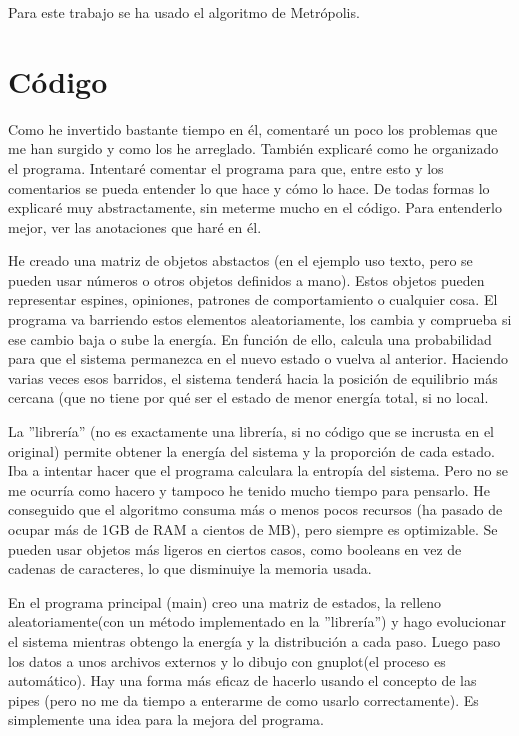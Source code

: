 \documentclass[a4paper,10pt,twocolumn]{article}
\begin{document}
Para este trabajo se ha usado el algoritmo de Metr\'opolis.


\section*{C\'odigo}

Como he invertido bastante tiempo en \'el, comentar\'e un poco los problemas que me han surgido y como los he arreglado. Tambi\'en explicar\'e como he organizado el programa. Intentar\'e comentar el programa para que, entre esto y los comentarios se pueda entender lo que hace y c\'omo lo hace. De todas formas lo explicar\'e muy abstractamente, sin meterme mucho en el c\'odigo. Para entenderlo mejor, ver las anotaciones que har\'e en \'el.

He creado una matriz de objetos abstactos (en el ejemplo uso texto, pero se pueden usar n\'umeros o otros objetos definidos a mano). Estos objetos pueden representar espines, opiniones, patrones de comportamiento o cualquier cosa. El programa va barriendo estos elementos aleatoriamente, los cambia y comprueba si ese cambio baja o sube la energ\'ia. En funci\'on de ello, calcula una probabilidad para que el sistema permanezca en el nuevo estado o vuelva al anterior. Haciendo varias veces esos barridos, el sistema tender\'a hacia la posici\'on de equilibrio m\'as cercana (que no tiene por qu\'e ser el estado de menor energ\'ia total, si no local.

La ''librer\'ia'' (no es exactamente una librer\'ia, si no c\'odigo que se incrusta en el original) permite obtener la energ\'ia del sistema y la proporci\'on de cada estado. Iba a intentar hacer que el programa calculara la entrop\'ia del sistema. Pero no se me ocurr\'ia como hacero y tampoco he tenido mucho tiempo para pensarlo. He conseguido que el algoritmo consuma m\'as o menos pocos recursos (ha pasado de ocupar m\'as de 1GB de RAM a cientos de MB), pero siempre es optimizable. Se pueden usar objetos m\'as ligeros en ciertos casos, como booleans en vez de cadenas de caracteres, lo que disminuiye la memoria usada.

En el programa principal (main) creo una matriz de estados, la relleno aleatoriamente(con un m\'etodo implementado en la ''librer\'ia'') y hago evolucionar el sistema mientras obtengo la energ\'ia y la distribuci\'on a cada paso. Luego paso los datos a unos archivos externos y lo dibujo con gnuplot(el proceso es autom\'atico). Hay una forma m\'as eficaz de hacerlo usando el concepto de las pipes (pero no me da tiempo a enterarme de como usarlo correctamente). Es simplemente una idea para la mejora del programa.
\end{document}
